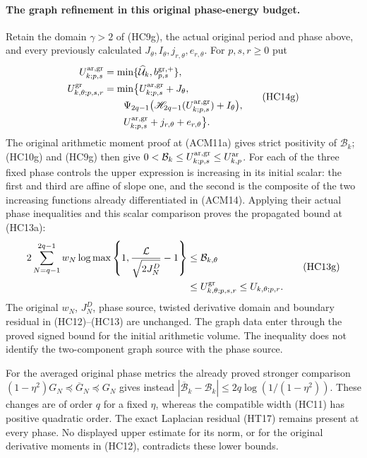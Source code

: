 \paragraph{The graph refinement in this original phase-energy budget.}
Retain the domain $\gamma>2$ of (HC9g), the actual original period
and phase above, and every previously calculated $J_\theta,I_\theta,
j_{r,\theta},e_{r,\theta}$. For $p,s,r\geq0$ put
\[
 \begin{aligned}
 U_{k;p,s}^{\rm ar,gr}
 &=\min\{\widehat{\mathcal U}_k,b_{p,s}^{\rm gr,+}\},\\
 U_{k,\theta;p,s,r}^{\rm gr}
 &=\min\bigl\{U_{k;p,s}^{\rm ar,gr}+J_\theta,\\
 &\qquad\Psi_{2q-1}\bigl(
       \mathscr H_{2q-1}(U_{k;p,s}^{\rm ar,gr})+I_\theta\bigr),\\
 &\qquad U_{k;p,s}^{\rm ar,gr}+j_{r,\theta}+e_{r,\theta}\bigr\}.
 \end{aligned}
 \tag{HC14g}
\]
The original arithmetic moment proof at (ACM11a) gives strict
positivity of $\mathcal B_k$; (HC10g) and (HC9g) then give
$0<\mathcal B_k\leq U_{k;p,s}^{\rm ar,gr}\leq U_{k,p}^{\rm ar}$.
For each of the three fixed phase controls the upper expression
is increasing in its initial scalar: the first and third are
affine of slope one, and the second is the composite of the
two increasing functions already differentiated in (ACM14).
Applying their actual phase inequalities and this scalar
comparison proves the propagated bound at (HC13a):
\[
 \begin{aligned}
 2\sum_{N=q-1}^{2q-1}w_N
 \log\max\left\{1,\frac{\mathcal L}{\sqrt{2J_N^D}}-1\right\}
 &\leq\mathcal B_{k,\theta}\\
 &\leq U_{k,\theta;p,s,r}^{\rm gr}
 \leq U_{k,\theta;p,r}.
 \end{aligned}
 \tag{HC13g}
\]
The original $w_N$, $J_N^D$, phase source, twisted derivative
domain and boundary residual in (HC12)--(HC13) are unchanged.
The graph data enter through the proved signed bound for the
initial arithmetic volume. The inequality does not identify
the two-component graph source with the phase source.

For the averaged original phase metrics the already proved stronger
comparison $(1-\eta^2)G_N\preceq\overline G_N\preceq G_N$ gives instead
$|\overline{\mathcal B}_k-\mathcal B_k|
\leq2q\log(1/(1-\eta^2))$.  These changes are of order $q$ for a fixed
$\eta$, whereas the compatible width (HC11) has positive quadratic
order.  The exact Laplacian residual (HT17) remains present at every
phase.  No displayed upper estimate for its norm, or for the original
derivative moments in (HC12), contradicts these lower bounds.

